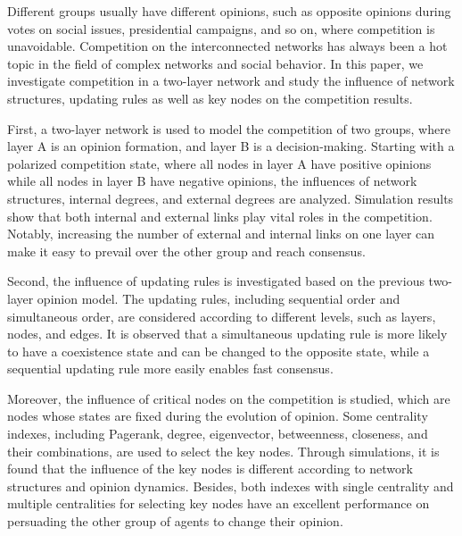 \begin{englishabstract}
	
Different groups usually have different opinions, such as opposite opinions during votes on social issues, presidential campaigns, and so on, where competition is unavoidable. Competition on the interconnected networks has always been a hot topic in the field of complex networks and social behavior.  In this paper, we investigate competition in a two-layer network and study the influence of network structures, updating rules as well as key nodes on the competition results.

First, a two-layer network is used to model the competition of two groups, where layer A is an opinion formation, and layer B is a decision-making. Starting with a polarized competition state, where all nodes in layer A have positive opinions while all nodes in layer B have negative opinions, the influences of network structures, internal degrees, and external degrees are analyzed.  Simulation results show that both internal and external links play vital roles in the competition. Notably, increasing the number of external and internal links on one layer can make it easy to prevail over the other group and reach consensus.

Second, the influence of updating rules is investigated based on the previous two-layer opinion model. The updating rules, including sequential order and simultaneous order, are considered according to different levels, such as layers, nodes, and edges. It is observed that a simultaneous updating rule is more likely to have a coexistence state and can be changed to the opposite state, while a sequential updating rule more easily enables fast consensus.

Moreover, the influence of critical nodes on the competition is studied, which are nodes whose states are fixed during the evolution of opinion. Some centrality indexes, including Pagerank, degree, eigenvector, betweenness, closeness, and their combinations, are used to select the key nodes. Through simulations, it is found that the influence of the key nodes is different according to network structures and opinion dynamics. Besides, both indexes with single centrality and multiple centralities for selecting key nodes have an excellent performance on persuading the other group of agents to change their opinion.\\ \\ 

\end{englishabstract}

